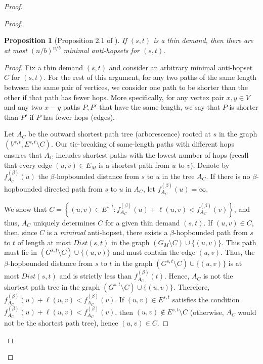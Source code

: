 \documentclass{article}
\newtheorem{proposition}[theorem]{Proposition}
\theoremstyle{definition}
\theoremstyle{remark}
\begin{document}
\begin{proof}
\begin{proof}
        \begin{proposition}[Proposition 2.1 of \cite{BBMRY11}] \label{prop:thin1}
            If $(s,t)$ is a thin demand, then there are at most $(n/b)^{n/b}$ minimal anti-hopsets for $(s,t)$.
        \end{proposition}
        \begin{proof}
            Fix a thin demand $(s,t)$ and consider an arbitrary minimal anti-hopset $C$ for $(s,t)$. For the rest of this argument, for any two paths of the same length between the same pair of vertices, we consider one path to be shorter than the other if that path has fewer hops. More specifically, for any vertex pair $x, y \in V$ and any two $x-y$ paths $P, P'$ that have the same length, we say that $P$ is shorter than $P'$ if $P$ has fewer hops (edges).
            
            Let $A_C$ be the outward shortest path tree (arborescence) rooted at $s$ in the graph $(V^{s,t}, E^{s,t} \setminus C)$. Our tie-breaking of same-length paths with different hops ensures that $A_C$ includes shortest paths with the lowest number of hops (recall that every edge $(u,v) \in E_M$ is a shortest path from $u$ to $v$). 
            Denote by $f^{(\beta)}_{A_C}(u)$ the $\beta$-hopbounded distance from $s$ to $u$ in the tree $A_C$. If there is no $\beta$-hopbounded directed path from $s$ to $u$ in $A_C$, let $f^{(\beta)}_{A_C}(u) = \infty$. 
            
            We show that $C = \left\{ (u,v) \in E^{s,t} : f^{(\beta)}_{A_C}(u) + \ell(u,v) <  f^{(\beta)}_{A_C}(v) \right\}$, and thus, $A_C$ uniquely determines $C$ for a given thin demand $(s,t)$. If $(u,v) \in C$, then, since $C$ is a \textit{minimal} anti-hopset, there exists a $\beta$-hopbounded path from $s$ to $t$ of length at most $Dist(s,t)$ in the graph $(G_M \setminus C) \cup \{(u,v)\}$. This path must lie in $(G^{s,t} \setminus C) \cup \{(u,v)\}$ and must contain the edge $(u,v)$. Thus, the $\beta$-hopbounded distance from $s$ to $t$ in the graph $(G^{s,t} \setminus C) \cup \{(u,v)\}$ is at most $Dist(s,t)$ and is strictly less than $f^{(\beta)}_{A_C}(t)$. Hence, $A_C$ is not the shortest path tree in the graph $(G^{s,t} \setminus C) \cup \{(u,v)\}$. Therefore, $f^{(\beta)}_{A_C}(u) + \ell(u,v) <  f^{(\beta)}_{A_C}(v)$. If $(u,v) \in E^{s,t}$ satisfies the condition $f^{(\beta)}_{A_C}(u) + \ell(u,v) <  f^{(\beta)}_{A_C}(v)$, then $(u,v) \notin E^{s,t} \setminus C$ (otherwise, $A_C$ would not be the shortest path tree), hence $(u,v) \in C$.


\end{proof}
\end{proof}
\end{proof}
\end{document}
